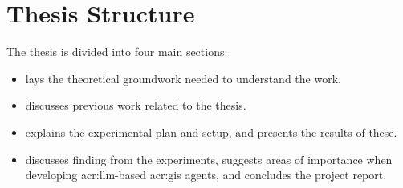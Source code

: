 \section{Thesis Structure}
\label{sec:thesisStructure}

The thesis is divided into four main sections:
\begin{itemize}
    \item {} lays the theoretical groundwork needed to understand the work.
    \item {} discusses previous work related to the thesis.
    \item {} explains the experimental plan and setup, and presents the results of these.
    \item {} discusses finding from the experiments, suggests areas of importance when developing \acrshort{acr:llm}-based \acrshort{acr:gis} agents, and concludes the project report.
\end{itemize}

\glsresetall